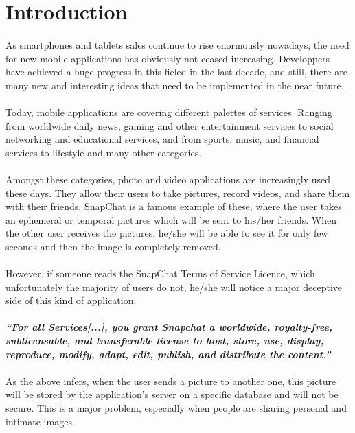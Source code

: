 \section{Introduction}
  \paragraph{}
    As smartphones and tablets sales continue to rise enormously nowadays, the need for new mobile applications has obviously not ceased increasing. Developpers have achieved a huge progress in this fieled in the last decade, and still, there are many new and interesting ideas that need to be implemented in the near future.
  \paragraph{}
    Today, mobile applications are covering different palettes of services. Ranging from worldwide daily news, gaming and other entertainment services to social networking and educational services, and from sports, music, and financial services to lifestyle and many other categories.
   \paragraph{}
    Amongst these categories, photo and video applications are increasingly used these days. They allow their users to take pictures, record videos, and share them with their friends. SnapChat is a famous example of these, where the user takes an ephemeral or temporal pictures which will be sent to his/her friends. When the other user receives the pictures, he/she will be able to see it for only few seconds and then the image is completely removed.
    \paragraph{}
    However, if someone reads the SnapChat Terms of Service Licence, which unfortunately the majority of users do not, he/she will notice a major deceptive side of this kind of application:
    \paragraph{}
    \textbf{\textit{\enquote{For all Services[...], you grant Snapchat a worldwide, royalty-free, sublicensable, and transferable license to host, store, use, display, reproduce, modify, adapt, edit, publish, and distribute the content.}}}
    \paragraph{}
    As the above infers, when the user sends a picture to another one, this picture will be stored by the application's server on a specific database and will not be secure. This is a major problem, especially when people are sharing personal and intimate images.
